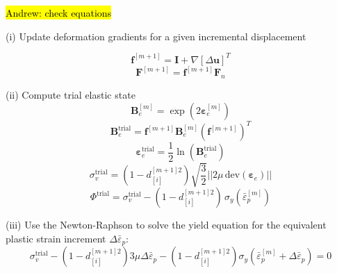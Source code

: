 \documentclass[sn-mathphys,Numbered,draft]{sn-jnl}%
\newcommand{\bb}{\boldsymbol}
\begin{document}
\hl{Andrew: check equations}\\
\begin{algorithm}[htbp] \label{alg:phaseField} \footnotesize
\SetAlgoLined
(i) Update deformation gradients for a given incremental displacement

\begin{equation}
  \textbf{f}^{[m+1]}=\textbf{I}+\nabla\left[\Delta\textbf{u}\right]^T \nonumber
\end{equation}
\begin{equation}
 \textbf{F}^{[m+1]}=\textbf{f}^{[m+1]}\textbf{F}_n\nonumber
\end{equation}

(ii) Compute trial elastic state
\begin{equation}
	\mathbf{B}_{e}^{[m]} = \exp\left({2\boldsymbol{\varepsilon}_{e}^{[m]}}\right) \nonumber
\end{equation}
\begin{equation}
	\mathbf{B}^{\text{trial}}_e = \mathbf{f}^{[m+1]}\mathbf{B}^{[m]}_e \left(\mathbf{f}^{[m+1]}\right)^{T}\nonumber
\end{equation}
\begin{equation}
	\boldsymbol{\varepsilon}^{\text{trial}}_e = \frac{1}{2} \ln \left(\textbf{B}^{\text{trial}}_e \right) \nonumber
\end{equation}
\begin{equation}
	\sigma_v^{\text{trial}} =
	\left(1 - d_{[i]}^{[m+1]2} \right) \sqrt{\frac{3}{2}} || 2\mu \, \text{dev}(\bb{\varepsilon}_e)|| \nonumber
\end{equation}
\begin{equation}
	\Phi^{\text{trial}} =
	\sigma_v^{\text{trial}}
	- \left(1 - d_{[i]}^{[m+1]2} \right) \, \sigma_{y}\left(\bar{\varepsilon}_p^{[m]} \right) \nonumber 
\end{equation}

(iii) Use the Newton-Raphson to solve the yield equation for the equivalent plastic strain increment $\Delta\bar{\varepsilon}_p$:
\begin{equation}
	\sigma_v^{\text{trial}}
	- \left(1 - d_{[i]}^{[m+1]2} \right) 3 \mu\Delta\bar{\varepsilon}_p
	- \left(1 - d_{[i]}^{[m+1]2} \right) \sigma_{y}(\bar{\varepsilon}_{p}^{[m]} + \Delta\bar{\varepsilon}_p)
	= 0 \nonumber
\end{equation}


\end{algorithm}
\end{document}
